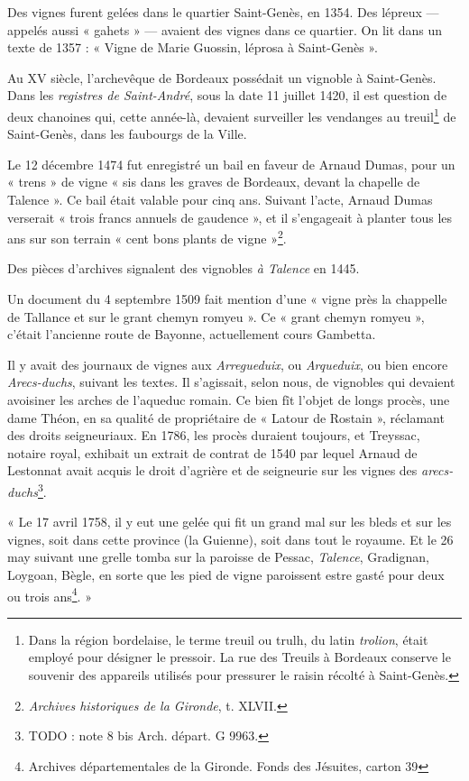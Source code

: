 \documentclass[a4paper,11pt]{book}
\begin{document}
Des vignes furent gelées dans le quartier Saint-Genès, en 1354. Des lépreux — appelés aussi « gahets » — avaient des vignes dans ce quartier. On lit dans un texte de 1357 : « Vigne de Marie Guossin, léprosa à Saint-Genès ».

Au XV\ieme{} siècle, l'archevêque de Bordeaux possédait un vignoble à Saint-Genès. Dans les \textit{registres de Saint-André}, sous la date 11 juillet 1420, il est question de deux chanoines qui, cette année-là, devaient surveiller les vendanges au treuil\footnote{Dans la région bordelaise, le terme treuil ou trulh, du latin \textit{trolion}, était employé pour désigner le pressoir. La rue des Treuils à Bordeaux conserve le souvenir des appareils utilisés pour pressurer le raisin récolté à Saint-Genès.} de Saint-Genès, dans les faubourgs de la Ville.

Le 12 décembre 1474 fut enregistré un bail en faveur de Arnaud Dumas, pour un « trens » de vigne « sis dans les graves de Bordeaux, devant la chapelle de Talence ». Ce bail était valable pour cinq ans. Suivant l'acte, Arnaud Dumas verserait « trois francs annuels de gaudence », et il s'engageait à planter tous les ans sur son terrain « cent bons plants de vigne »\footnote{\textit{Archives historiques de la Gironde}, t. XLVII.}.

Des pièces d'archives signalent des vignobles \textit{à Talence}
en 1445.

Un document du 4 septembre 1509 fait mention d'une « vigne près la chappelle de Tallance et sur le grant chemyn romyeu ». Ce « grant chemyn romyeu », c'était l'ancienne route de Bayonne, actuellement cours Gambetta.

Il y avait des journaux de vignes aux \textit{Arregueduix}, ou \textit{Arqueduix}, ou bien encore \textit{Arecs-duchs}, suivant les textes. Il s'agissait, selon nous, de vignobles qui devaient avoisiner les arches de l'aqueduc romain. Ce bien fît l'objet de longs procès, une dame Théon, en sa qualité de propriétaire de « Latour de Rostain », réclamant des droits seigneuriaux. En 1786, les procès duraient toujours, et Treyssac, notaire royal, exhibait un extrait de contrat de 1540 par lequel Arnaud de Lestonnat avait acquis le droit d'agrière et de seigneurie sur les vignes des \textit{arecs-duchs}\footnote[8 bis]{TODO : note 8 bis Arch. départ. G 9963.}.

« Le 17 avril 1758, il y eut une gelée qui fit un grand mal sur les bleds et sur les vignes, soit dans cette province (la Guienne), soit dans tout le royaume. Et le 26 may suivant une grelle tomba sur la paroisse de Pessac, \textit{Talence}, Gradignan, Loygoan, Bègle, en sorte que les pied de vigne paroissent estre gasté pour deux ou trois ans\footnote{Archives départementales de la Gironde. Fonds des Jésuites, carton 39}. »
\end{document}

